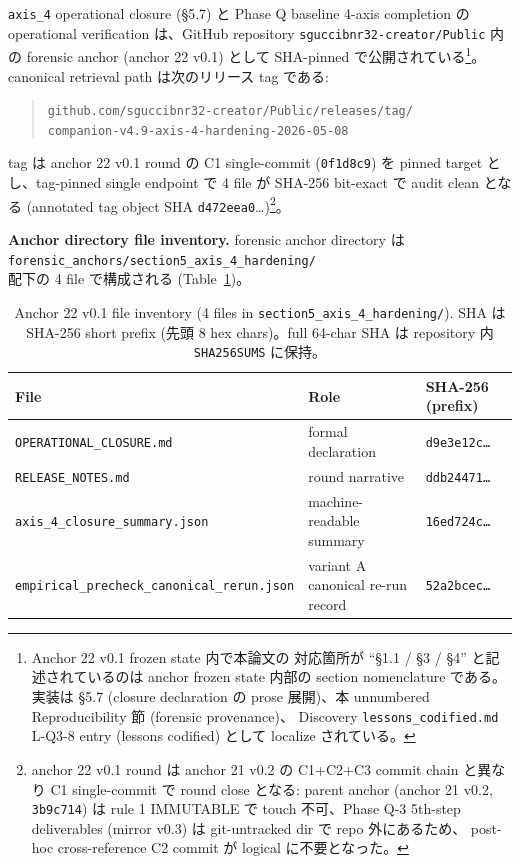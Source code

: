 \documentclass[11pt,a4paper]{ltjsarticle}
\begin{document}
\texttt{axis\_4} operational closure (\S 5.7) と Phase Q baseline 4-axis
completion の operational verification は、GitHub repository
\texttt{sguccibnr32-creator/Public} 内の forensic anchor (anchor 22 v0.1) として
SHA-pinned で公開されている\footnote{Anchor 22 v0.1 frozen state 内で本論文の
対応箇所が ``\S 1.1 / \S 3 / \S 4'' と記述されているのは anchor frozen state
内部の section nomenclature である。実装は \S 5.7 (closure declaration の
prose 展開)、本 unnumbered Reproducibility 節 (forensic provenance)、
Discovery \texttt{lessons\_codified.md} L-Q3-8 entry (lessons codified)
として localize されている。}。canonical retrieval path は次のリリース tag
である:

\begin{quote}
\texttt{github.com/sguccibnr32-creator/Public/releases/tag/}\\
\texttt{companion-v4.9-axis-4-hardening-2026-05-08}
\end{quote}

\noindent
tag は anchor 22 v0.1 round の C1 single-commit (\texttt{0f1d8c9}) を pinned
target とし、tag-pinned single endpoint で 4 file が SHA-256 bit-exact で
audit clean となる (annotated tag object SHA \texttt{d472eea0}\dots)\footnote{
anchor 22 v0.1 round は anchor 21 v0.2 の C1+C2+C3 commit chain と異なり
C1 single-commit で round close となる: parent anchor (anchor 21 v0.2,
\texttt{3b9c714}) は rule 1 IMMUTABLE で touch 不可、Phase Q-3 5th-step
deliverables (mirror v0.3) は git-untracked dir で repo 外にあるため、
post-hoc cross-reference C2 commit が logical に不要となった。}。

\noindent\textbf{Anchor directory file inventory.}\quad
forensic anchor directory は\\
\hspace*{1em}\texttt{forensic\_anchors/section5\_axis\_4\_hardening/}\\
配下の 4 file で構成される (Table~\ref{tab:anchor-22-v01-files})。

\begin{table}[h]
\centering
\small
\caption{Anchor 22 v0.1 file inventory (4 files in
\texttt{section5\_axis\_4\_hardening/}). SHA は SHA-256 short prefix
(先頭 8 hex chars)。full 64-char SHA は repository 内 \texttt{SHA256SUMS} に保持。}
\label{tab:anchor-22-v01-files}
\begin{tabular}{lll}
\hline
File & Role & SHA-256 (prefix) \\
\hline
\texttt{OPERATIONAL\_CLOSURE.md}                       & formal declaration              & \texttt{d9e3e12c\dots} \\
\texttt{RELEASE\_NOTES.md}                             & round narrative                 & \texttt{ddb24471\dots} \\
\texttt{axis\_4\_closure\_summary.json}                & machine-readable summary        & \texttt{16ed724c\dots} \\
\texttt{empirical\_precheck\_canonical\_rerun.json}    & variant A canonical re-run record & \texttt{52a2bcec\dots} \\
\hline
\end{tabular}
\end{table}
\end{document}
